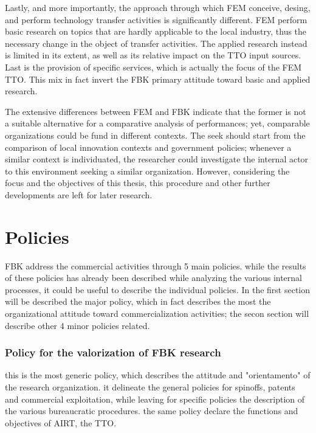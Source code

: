 Lastly, and more importantly, the approach through which FEM conceive, desing, and perform technology transfer activities is significantly different. FEM perform basic research on topics that are hardly applicable to the local industry, thus the necessary change in the object of transfer activities. The applied research instead is limited in its extent, as well as its relative impact on the TTO input sources. Last is the provision of specific services, which is actually the focus of the FEM TTO. This mix in fact invert the FBK primary attitude toward basic and applied research.

The extensive differences between FEM and FBK indicate that the former is not a suitable alternative for a comparative analysis of performances; yet, comparable organizations could be fund in different contexts. The seek should start from the comparison of local innovation contexts and government policies; whenever a similar context is individuated, the researcher could investigate the internal actor to this environment seeking a similar organization. However, considering the focus and the objectives of this thesis, this procedure and other further developments are left for later research.

\section{Policies}

FBK address the commercial activities through 5 main policies. while the results of these policies has already been described while analyzing the various internal processes, it could be useful to describe the individual policies. In the first section will be described the major policy, which in fact describes the most the organizational attitude toward commercialization activities; the secon section will describe other 4 minor policies related.

\subsubsection{Policy for the valorization of FBK research}

this is the most generic policy, which describes the attitude and "orientamento" of the research organization. it delineate the general policies for spinoffs, patents and commercial exploitation, while leaving for specific policies the description of the various bureaucratic procedures. the same policy declare the functions and objectives of AIRT, the TTO.

